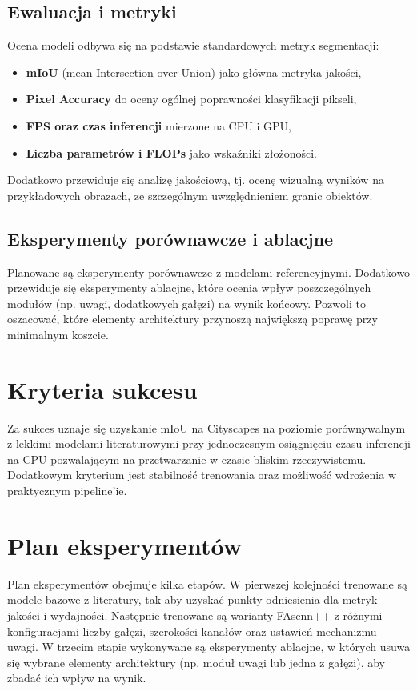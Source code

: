 \documentclass[12pt,oneside,a4paper]{report}
\begin{document}
\subsection{Ewaluacja i metryki}
Ocena modeli odbywa się na podstawie standardowych metryk segmentacji:
\begin{itemize}
  \item \textbf{mIoU} (mean Intersection over Union) jako główna metryka jakości,
  \item \textbf{Pixel Accuracy} do oceny ogólnej poprawności klasyfikacji pikseli,
  \item \textbf{FPS oraz czas inferencji} mierzone na CPU i GPU,
  \item \textbf{Liczba parametrów i FLOPs} jako wskaźniki złożoności.
\end{itemize}
Dodatkowo przewiduje się analizę jakościową, tj. ocenę wizualną wyników na
przykładowych obrazach, ze szczególnym uwzględnieniem granic obiektów.

\subsection{Eksperymenty porównawcze i ablacjne}
Planowane są eksperymenty porównawcze z modelami referencyjnymi. Dodatkowo
przewiduje się eksperymenty ablacjne, które ocenia wpływ poszczególnych modułów
(np. uwagi, dodatkowych gałęzi) na wynik końcowy. Pozwoli to oszacować, które
elementy architektury przynoszą największą poprawę przy minimalnym koszcie.

\section{Kryteria sukcesu}
Za sukces uznaje się uzyskanie mIoU na Cityscapes na poziomie porównywalnym z
lekkimi modelami literaturowymi przy jednoczesnym osiągnięciu czasu inferencji
na CPU pozwalającym na przetwarzanie w czasie bliskim rzeczywistemu. Dodatkowym
kryterium jest stabilność trenowania oraz możliwość wdrożenia w praktycznym
pipeline'ie.

\section{Plan eksperymentów}
Plan eksperymentów obejmuje kilka etapów. W pierwszej kolejności trenowane są
modele bazowe z literatury, tak aby uzyskać punkty odniesienia dla metryk
jakości i wydajności. Następnie trenowane są warianty FAscnn++ z różnymi konfiguracjami
liczby gałęzi, szerokości kanałów oraz ustawień mechanizmu uwagi. W trzecim
etapie wykonywane są eksperymenty ablacjne, w których usuwa się wybrane elementy
architektury (np. moduł uwagi lub jedna z gałęzi), aby zbadać ich wpływ na wynik.
\end{document}
